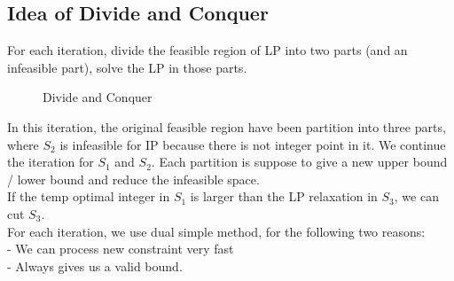 			\subsection{Idea of Divide and Conquer}
				For each iteration, divide the feasible region of LP into two parts (and an infeasible part), solve the LP in those parts.\\
				\begin{figure}[!ht]
					\centering
					\caption{Divide and Conquer}
				\end{figure}
				In this iteration, the original feasible region have been partition into three parts, where $S_2$ is infeasible for IP because there is not integer point in it. We continue the iteration for $S_1$ and $S_2$. Each partition is suppose to give a new upper bound / lower bound and reduce the infeasible space.\\
				If the temp optimal integer in $S_1$ is larger than the LP relaxation in $S_3$, we can cut $S_3$.\\
				For each iteration, we use dual simple method, for the following two reasons:\\
				\indent - We can process new constraint very fast\\
				\indent - Always gives us a valid bound.\\
				
